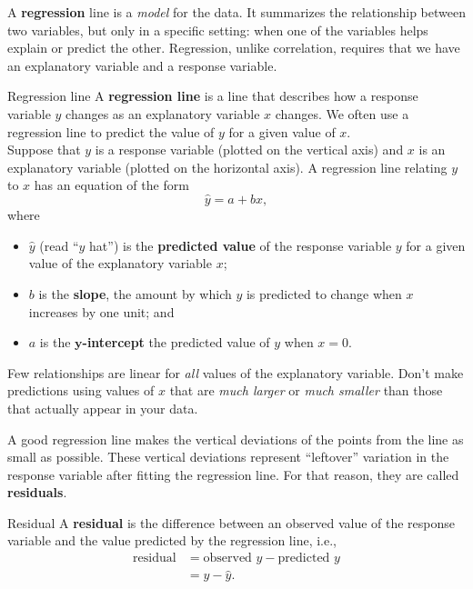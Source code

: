 A \textbf{regression} line is a \textit{model} for the data. It summarizes the relationship between two variables, but only in a specific setting: when one of the variables helps explain or predict the other. Regression, unlike correlation, requires that we have an explanatory variable and a response variable.

\begin{definition}{Regression line}{}
    A \textbf{regression line} is a line that describes how a response variable $y$ changes as an explanatory variable $x$ changes. We often use a regression line to predict the value of $y$ for a given value of $x$. \\
    Suppose that $y$ is a response variable (plotted on the vertical axis) and $x$ is an explanatory variable (plotted on the horizontal axis). A regression line relating $y$ to $x$ has an equation of the form
    \[
        \hat{y} = a + bx,
    \]
    where
    \begin{itemize}[itemsep=0cm]
    \item $\hat{y}$ (read ``$y$ hat'') is the \textbf{predicted value} of the response variable $y$ for a given value of the explanatory variable $x$;
    \item $b$ is the \textbf{slope}, the amount by which $y$ is predicted to change when $x$ increases by one unit; and
    \item $a$ is the \textbf{$\mathbf{y}$-intercept} the predicted value of $y$ when $x = 0$.
    \end{itemize}
\end{definition}
Few relationships are linear for \textit{all} values of the explanatory variable. Don't make predictions using values of $x$ that are \textit{much larger} or \textit{much smaller} than those that actually appear in your data.

A good regression line makes the vertical deviations of the points from the line as small as possible. These vertical deviations represent ``leftover'' variation in the response variable after fitting the regression line. For that reason, they are called \textbf{residuals}.

\begin{definition}{Residual}{}
    A \textbf{residual} is the difference between an observed value of the response variable and the value predicted by the regression line, i.e.,
    \begin{align*}
        \text{residual}
        &= \text{observed $y$} - \text{predicted $y$} \\
        &= y - \hat{y}.
    \end{align*}
\end{definition}

